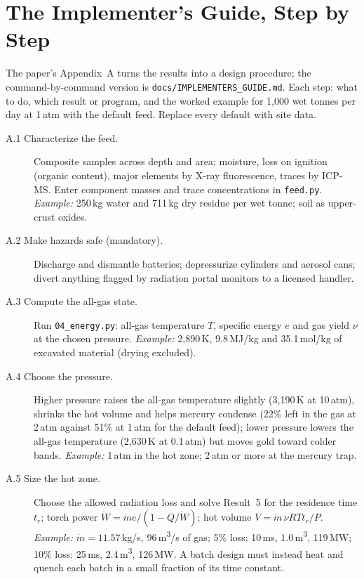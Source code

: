 \documentclass[11pt,a4paper]{article}
\begin{document}
\appendix
\section{The Implementer's Guide, Step by Step}\label{app:guide}
The paper's Appendix~A turns the results into a design procedure; the command-by-command version is \texttt{docs/IMPLEMENTERS\_GUIDE.md}. Each step: what to do, which result or program, and the worked example for 1,000 wet tonnes per day at 1\,atm with the default feed. Replace every default with site data.
\begin{description}
\item[A.1 Characterize the feed.] Composite samples across depth and area; moisture, loss on ignition (organic content), major elements by X-ray fluorescence, traces by ICP-MS. Enter component masses and trace concentrations in \texttt{feed.py}. \emph{Example:} 250\,kg water and 711\,kg dry residue per wet tonne; soil as upper-crust oxides.
\item[A.2 Make hazards safe (mandatory).] Discharge and dismantle batteries; depressurize cylinders and aerosol cans; divert anything flagged by radiation portal monitors to a licensed handler.
\item[A.3 Compute the all-gas state.] Run \texttt{04\_energy.py}: all-gas temperature $T$, specific energy $e$ and gas yield $\nu$ at the chosen pressure. \emph{Example:} 2,890\,K, 9.8\,MJ/kg and 35.1\,mol/kg of excavated material (drying excluded).
\item[A.4 Choose the pressure.] Higher pressure raises the all-gas temperature slightly (3,190\,K at 10\,atm), shrinks the hot volume and helps mercury condense (22\% left in the gas at 2\,atm against 51\% at 1\,atm for the default feed); lower pressure lowers the all-gas temperature (2,630\,K at 0.1\,atm) but moves gold toward colder bands. \emph{Example:} 1\,atm in the hot zone; 2\,atm or more at the mercury trap.
\item[A.5 Size the hot zone.] Choose the allowed radiation loss and solve Result~5 for the residence time $t_r$; torch power $\dot W = \dot m e/(1 - Q/\dot W)$; hot volume $V = \dot m\,\nu RT t_r/P$. \emph{Example:} $\dot m = 11.57$\,kg/s, 96\,m\textsuperscript{3}/s of gas; 5\% loss: 10\,ms, 1.0\,m\textsuperscript{3}, 119\,MW; 10\% loss: 25\,ms, 2.4\,m\textsuperscript{3}, 126\,MW. A batch design must instead heat and quench each batch in a small fraction of its time constant.

\end{description}
\end{document}
